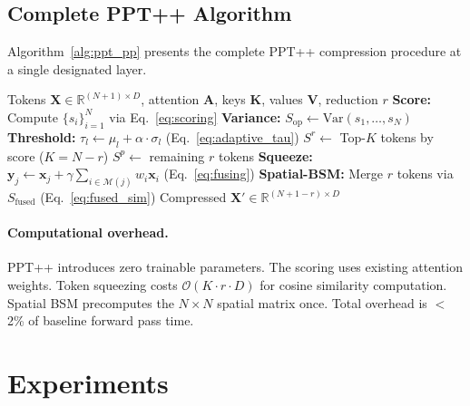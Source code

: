 \documentclass[10pt,twocolumn,letterpaper]{article}
\begin{document}
\subsection{Complete PPT++ Algorithm}

Algorithm~\ref{alg:ppt_pp} presents the complete PPT++ compression procedure
at a single designated layer.

\begin{algorithm}[t]
\caption{PPT++ Compression at Layer $l$}
\label{alg:ppt_pp}
\begin{algorithmic}[1]
\REQUIRE Tokens $\mathbf{X} \in \mathbb{R}^{(N+1) \times D}$, attention
$\mathbf{A}$, keys $\mathbf{K}$, values $\mathbf{V}$, reduction $r$
\STATE \textbf{Score:} Compute $\{s_i\}_{i=1}^N$ via Eq.~\eqref{eq:scoring}
\STATE \textbf{Variance:} $S_{\text{op}} \leftarrow \text{Var}(s_1, \ldots, s_N)$
\STATE \textbf{Threshold:} $\tau_l \leftarrow \mu_l + \alpha \cdot \sigma_l$ (Eq.~\eqref{eq:adaptive_tau})
    \STATE $S^r \leftarrow$ Top-$K$ tokens by score ($K = N - r$)
    \STATE $S^p \leftarrow$ remaining $r$ tokens
    \STATE \textbf{Squeeze:} $\mathbf{y}_j \leftarrow \mathbf{x}_j + \gamma \sum_{i \in \mathcal{M}(j)} w_i \mathbf{x}_i$ (Eq.~\eqref{eq:fusing})
\ELSE
    \STATE \textbf{Spatial-BSM:} Merge $r$ tokens via $S_{\text{fused}}$ (Eq.~\eqref{eq:fused_sim})
\ENDIF
\RETURN Compressed $\mathbf{X}' \in \mathbb{R}^{(N+1-r) \times D}$
\end{algorithmic}
\end{algorithm}

\paragraph{Computational overhead.} PPT++ introduces zero trainable parameters.
The scoring uses existing attention weights. Token squeezing costs
$\mathcal{O}(K \cdot r \cdot D)$ for cosine similarity computation. Spatial BSM
precomputes the $N \times N$ spatial matrix once. Total overhead is $<$2\% of
baseline forward pass time.



\section{Experiments}
\label{sec:experiments}
\end{document}
